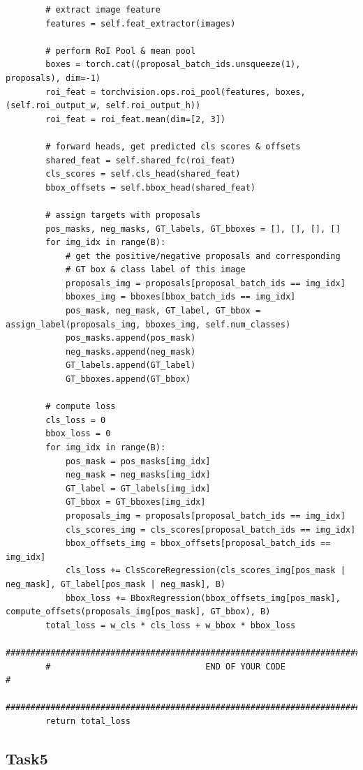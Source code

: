 \documentclass{article}%
\begin{document}
\begin{lstlisting}
        # extract image feature
        features = self.feat_extractor(images)

        # perform RoI Pool & mean pool
        boxes = torch.cat((proposal_batch_ids.unsqueeze(1), proposals), dim=-1)
        roi_feat = torchvision.ops.roi_pool(features, boxes, (self.roi_output_w, self.roi_output_h))
        roi_feat = roi_feat.mean(dim=[2, 3])

        # forward heads, get predicted cls scores & offsets
        shared_feat = self.shared_fc(roi_feat)
        cls_scores = self.cls_head(shared_feat)
        bbox_offsets = self.bbox_head(shared_feat)

        # assign targets with proposals
        pos_masks, neg_masks, GT_labels, GT_bboxes = [], [], [], []
        for img_idx in range(B):
            # get the positive/negative proposals and corresponding
            # GT box & class label of this image
            proposals_img = proposals[proposal_batch_ids == img_idx]
            bboxes_img = bboxes[bbox_batch_ids == img_idx]
            pos_mask, neg_mask, GT_label, GT_bbox = assign_label(proposals_img, bboxes_img, self.num_classes)
            pos_masks.append(pos_mask)
            neg_masks.append(neg_mask)
            GT_labels.append(GT_label)
            GT_bboxes.append(GT_bbox)

        # compute loss
        cls_loss = 0
        bbox_loss = 0
        for img_idx in range(B):
            pos_mask = pos_masks[img_idx]
            neg_mask = neg_masks[img_idx]
            GT_label = GT_labels[img_idx]
            GT_bbox = GT_bboxes[img_idx]
            proposals_img = proposals[proposal_batch_ids == img_idx]
            cls_scores_img = cls_scores[proposal_batch_ids == img_idx]
            bbox_offsets_img = bbox_offsets[proposal_batch_ids == img_idx]
            cls_loss += ClsScoreRegression(cls_scores_img[pos_mask | neg_mask], GT_label[pos_mask | neg_mask], B)
            bbox_loss += BboxRegression(bbox_offsets_img[pos_mask], compute_offsets(proposals_img[pos_mask], GT_bbox), B)
        total_loss = w_cls * cls_loss + w_bbox * bbox_loss
        ##############################################################################
        #                               END OF YOUR CODE                             #
        ##############################################################################
        return total_loss
\end{lstlisting}

\subsection{Task5}
\end{document}

